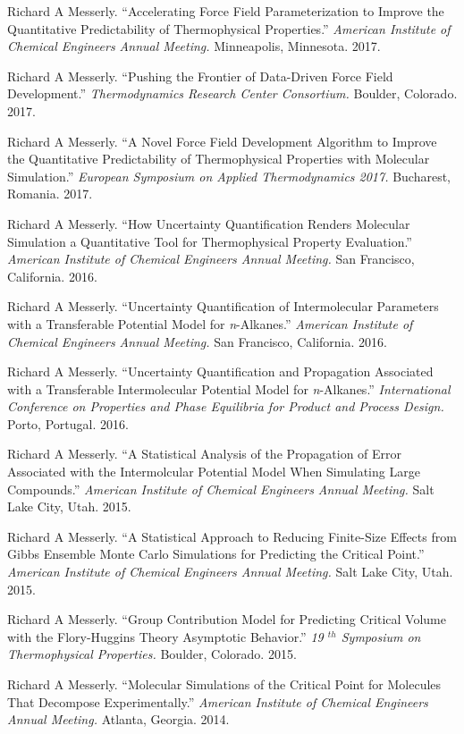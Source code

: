 \documentclass[12pt]{article}
\begin{document}
\begin{etaremune}
	
\item Richard A Messerly. ``Accelerating Force Field Parameterization to Improve the Quantitative Predictability of Thermophysical Properties.'' \textit{American Institute of Chemical Engineers Annual Meeting.} Minneapolis, Minnesota. 2017.
	
\item Richard A Messerly. ``Pushing the Frontier of Data-Driven Force Field Development.'' \textit{Thermodynamics Research Center Consortium.} Boulder, Colorado. 2017.
	
\item Richard A Messerly. ``A Novel Force Field Development Algorithm to Improve the Quantitative Predictability of Thermophysical Properties with Molecular Simulation.'' \textit{European Symposium on Applied Thermodynamics 2017.} Bucharest, Romania. 2017.

\item Richard A Messerly. ``How Uncertainty Quantification Renders Molecular Simulation a Quantitative Tool for Thermophysical Property Evaluation.'' \textit{American Institute of Chemical Engineers Annual Meeting.} San Francisco, California. 2016.

\item Richard A Messerly. ``Uncertainty Quantification of Intermolecular Parameters with a Transferable Potential Model for \textit{n}-Alkanes.'' \textit{American Institute of Chemical Engineers Annual Meeting.} San Francisco, California. 2016.

\item Richard A Messerly. ``Uncertainty Quantification and Propagation Associated with a Transferable Intermolecular Potential Model for \textit{n}-Alkanes.'' \textit{International Conference on Properties and Phase Equilibria for Product and Process Design.} Porto, Portugal. 2016.

\item Richard A Messerly. ``A Statistical Analysis of the Propagation of Error Associated with the Intermolcular Potential Model When Simulating Large Compounds.'' \textit{American Institute of Chemical Engineers Annual Meeting.} Salt Lake City, Utah. 2015.

\item Richard A Messerly. ``A Statistical Approach to Reducing Finite-Size Effects from Gibbs Ensemble Monte Carlo Simulations for Predicting the Critical Point.'' \textit{American Institute of Chemical Engineers Annual Meeting.} Salt Lake City, Utah. 2015.

\item Richard A Messerly. ``Group Contribution Model for Predicting Critical Volume with the Flory-Huggins Theory Asymptotic Behavior.'' \textit{19 $^{th}$ Symposium on Thermophysical Properties.} Boulder, Colorado. 2015.

\item Richard A Messerly. ``Molecular Simulations of the Critical Point for Molecules That Decompose Experimentally.'' \textit{American Institute of Chemical Engineers Annual Meeting.} Atlanta, Georgia. 2014.

\end{etaremune}
\end{document}
